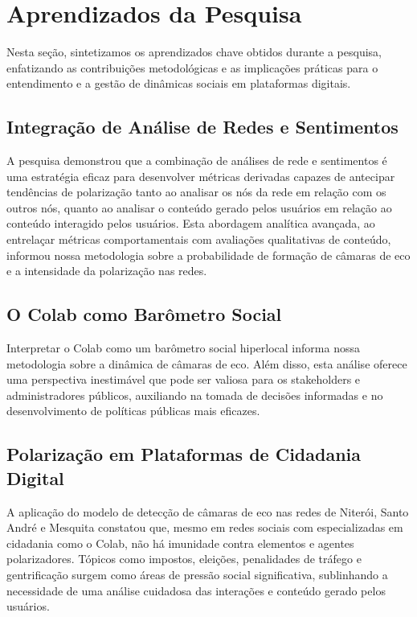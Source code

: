 \section{Aprendizados da Pesquisa}

Nesta seção, sintetizamos os aprendizados chave obtidos durante a pesquisa, enfatizando as contribuições metodológicas e as implicações práticas para o entendimento e a gestão de dinâmicas sociais em plataformas digitais.

\subsection*{Integração de Análise de Redes e Sentimentos}

A pesquisa demonstrou que a combinação de análises de rede e sentimentos é uma estratégia eficaz para desenvolver métricas derivadas capazes de antecipar tendências de polarização tanto ao analisar os nós da rede em relação com os outros nós, quanto ao analisar o conteúdo gerado pelos usuários em relação ao conteúdo interagido pelos usuários. Esta abordagem analítica avançada, ao entrelaçar métricas comportamentais com avaliações qualitativas de conteúdo, informou nossa metodologia sobre a probabilidade de formação de câmaras de eco e a intensidade da polarização nas redes.

\subsection*{O Colab como Barômetro Social}

Interpretar o Colab como um barômetro social hiperlocal informa nossa metodologia sobre a dinâmica de câmaras de eco. Além disso, esta análise oferece uma perspectiva inestimável que pode ser valiosa para os stakeholders e administradores públicos, auxiliando na tomada de decisões informadas e no desenvolvimento de políticas públicas mais eficazes.

\subsection*{Polarização em Plataformas de Cidadania Digital}

A aplicação do modelo de detecção de câmaras de eco nas redes de Niterói, Santo André e Mesquita constatou que, mesmo em redes sociais com especializadas em cidadania como o Colab, não há imunidade contra elementos e agentes polarizadores. Tópicos como impostos, eleições, penalidades de tráfego e gentrificação surgem como áreas de pressão social significativa, sublinhando a necessidade de uma análise cuidadosa das interações e conteúdo gerado pelos usuários.

